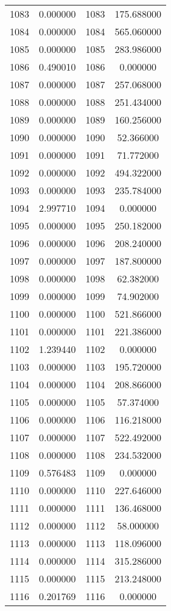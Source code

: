 \documentclass[12pt]{article}
\begin{document}
\begin{longtable}{@{}cccc@{}}
1083 & 0.000000 & 1083 & 175.688000 \\
1084 & 0.000000 & 1084 & 565.060000 \\
1085 & 0.000000 & 1085 & 283.986000 \\
1086 & 0.490010 & 1086 & 0.000000 \\
1087 & 0.000000 & 1087 & 257.068000 \\
1088 & 0.000000 & 1088 & 251.434000 \\
1089 & 0.000000 & 1089 & 160.256000 \\
1090 & 0.000000 & 1090 & 52.366000 \\
1091 & 0.000000 & 1091 & 71.772000 \\
1092 & 0.000000 & 1092 & 494.322000 \\
1093 & 0.000000 & 1093 & 235.784000 \\
1094 & 2.997710 & 1094 & 0.000000 \\
1095 & 0.000000 & 1095 & 250.182000 \\
1096 & 0.000000 & 1096 & 208.240000 \\
1097 & 0.000000 & 1097 & 187.800000 \\
1098 & 0.000000 & 1098 & 62.382000 \\
1099 & 0.000000 & 1099 & 74.902000 \\
1100 & 0.000000 & 1100 & 521.866000 \\
1101 & 0.000000 & 1101 & 221.386000 \\
1102 & 1.239440 & 1102 & 0.000000 \\
1103 & 0.000000 & 1103 & 195.720000 \\
1104 & 0.000000 & 1104 & 208.866000 \\
1105 & 0.000000 & 1105 & 57.374000 \\
1106 & 0.000000 & 1106 & 116.218000 \\
1107 & 0.000000 & 1107 & 522.492000 \\
1108 & 0.000000 & 1108 & 234.532000 \\
1109 & 0.576483 & 1109 & 0.000000 \\
1110 & 0.000000 & 1110 & 227.646000 \\
1111 & 0.000000 & 1111 & 136.468000 \\
1112 & 0.000000 & 1112 & 58.000000 \\
1113 & 0.000000 & 1113 & 118.096000 \\
1114 & 0.000000 & 1114 & 315.286000 \\
1115 & 0.000000 & 1115 & 213.248000 \\
1116 & 0.201769 & 1116 & 0.000000 \\

\end{longtable}
\end{document}
